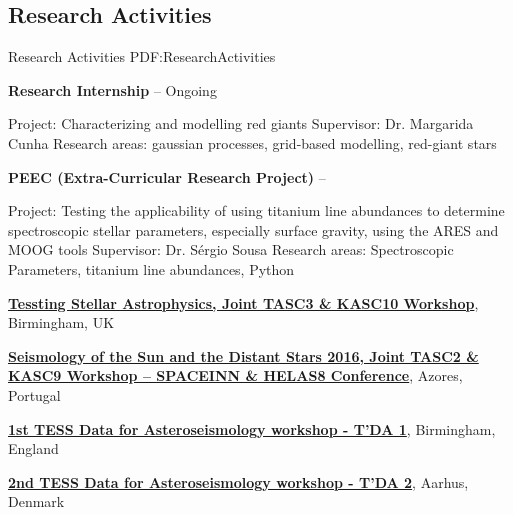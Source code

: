\documentclass[letterpaper,10pt,oneside]{article}
\begin{document}
\begin{body}


\section
{Research Activities}
{Research Activities}
{PDF:ResearchActivities}

{\textbf{Research Internship}}
\hfill
{} -- Ongoing
\begin{detail}
\SubBulletItem
Project:
​Characterizing and modelling red giants
\SubBulletItem
Supervisor:
Dr. Margarida Cunha
\SubBulletItem
Research areas: gaussian processes, grid-based modelling, red-giant stars
\end{detail}

\BigGap
{\textbf{PEEC (Extra-Curricular Research Project)}}
\hfill
{} --
\begin{detail}
\SubBulletItem
Project:
Testing the applicability of using titanium line abundances to determine spectroscopic stellar parameters, especially surface gravity, using the ARES and MOOG tools
\SubBulletItem
Supervisor:
Dr. Sérgio Sousa
\SubBulletItem
Research areas: Spectroscopic Parameters, titanium line abundances, Python
\end{detail}

\BigGap
\href{http://www.tasc3kasc10.com/}
{\textbf{Tessting Stellar Astrophysics, Joint TASC3 \& KASC10 Workshop}},
Birmingham, UK
\hfill
{}

\BigGap
\href{http://www.iastro.pt/research/conferences/spacetk16/}
{\textbf{Seismology of the Sun and the Distant Stars 2016, Joint TASC2 \& KASC9 Workshop – SPACEINN \& HELAS8 Conference}},
Azores, Portugal
\hfill
{}

\BigGap
\href{http://sac.au.dk/currently/tess-data-for-asteroseismology-workshop/}
{\textbf{1st TESS Data for Asteroseismology workshop - T'DA 1}},
Birmingham, England
\hfill
{}

\BigGap
\href{http://sac.au.dk/currently/2nd-tess-data-for-asteroseismology-workshop/}
{\textbf{2nd TESS Data for Asteroseismology workshop - T'DA 2}},
Aarhus, Denmark
\hfill
{}


\end{body}
\end{document}
